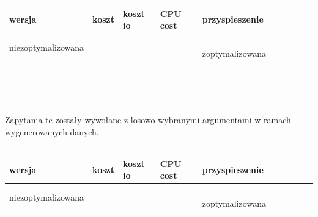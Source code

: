 \documentclass[11pt]{article}
\numberwithin{figure}{subsection}
\begin{document}
		\begin{lstlisting}[caption={Wywołanie zapytań}, captionpos=b]
		\end{lstlisting}
		
		\begin{tabularx}{\textwidth}{|X|X|X|X|X|}
			\hline
			wersja & koszt & koszt io & CPU cost & przyspieszenie \\
			\hline
			niezoptymalizowana &  &  &  &  \
			\hline
			zoptymalizowana &  &  &  &  \
			\hline
		\end{tabularx}
		
		\begin{tabularx}{\textwidth}{|X|X|X|X|X|X|}
		\end{tabularx}
		
		\begin{tabularx}{\textwidth}{|X|X|X|X|X|X|}
		\end{tabularx}
		
		
		
		
		
		
		
		
		
		
		
	
	\subsection{}
			
		\begin{lstlisting}[caption={Wersja niezoptymalizowana},captionpos=b]
		\end{lstlisting}
			
		\begin{lstlisting}[caption={Wersja zoptymalizowana},captionpos=b]
		\end{lstlisting}
		
		Zapytania te zostały wywołane z losowo wybranymi argumentami w ramach
		wygenerowanych danych. \\
		
		\begin{lstlisting}[caption={Wywołanie zapytań}, captionpos=b]
		\end{lstlisting}
		
		\begin{tabularx}{\textwidth}{|X|X|X|X|X|}
			\hline
			wersja & koszt & koszt io & CPU cost & przyspieszenie \\
			\hline
			niezoptymalizowana &  &  &  &  \
			\hline
			zoptymalizowana &  &  &  &  \
			\hline
		\end{tabularx}
		
\end{document}
